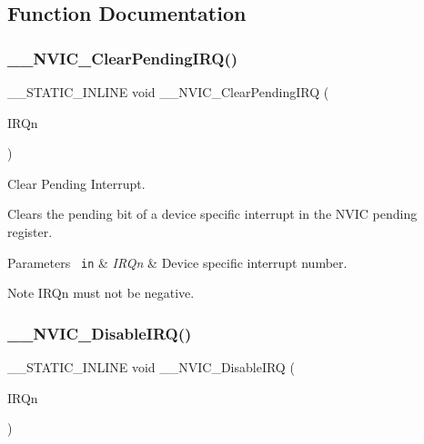 \subsection{Function Documentation}
\mbox{\label{group___c_m_s_i_s___core___n_v_i_c_functions_ga562a86dbdf14827d0fee8fdafb04d191}} 
\subsubsection{\texorpdfstring{\_\_NVIC\_ClearPendingIRQ()}{\_\_NVIC\_ClearPendingIRQ()}}
{\footnotesize\ttfamily \+\_\+\+\_\+\+S\+T\+A\+T\+I\+C\+\_\+\+I\+N\+L\+I\+NE void \+\_\+\+\_\+\+N\+V\+I\+C\+\_\+\+Clear\+Pending\+I\+RQ (\begin{DoxyParamCaption}\item[{I\+R\+Qn\+\_\+\+Type}]{I\+R\+Qn }\end{DoxyParamCaption})}



Clear Pending Interrupt. 

Clears the pending bit of a device specific interrupt in the N\+V\+IC pending register. 
\begin{DoxyParams}[1]{Parameters}
\mbox{\texttt{ in}}  & {\em I\+R\+Qn} & Device specific interrupt number. \\
\hline
\end{DoxyParams}
\begin{DoxyNote}{Note}
I\+R\+Qn must not be negative. 
\end{DoxyNote}
\mbox{\label{group___c_m_s_i_s___core___n_v_i_c_functions_gae016e4c1986312044ee768806537d52f}} 
\subsubsection{\texorpdfstring{\_\_NVIC\_DisableIRQ()}{\_\_NVIC\_DisableIRQ()}}
{\footnotesize\ttfamily \+\_\+\+\_\+\+S\+T\+A\+T\+I\+C\+\_\+\+I\+N\+L\+I\+NE void \+\_\+\+\_\+\+N\+V\+I\+C\+\_\+\+Disable\+I\+RQ (\begin{DoxyParamCaption}\item[{I\+R\+Qn\+\_\+\+Type}]{I\+R\+Qn }\end{DoxyParamCaption})}



